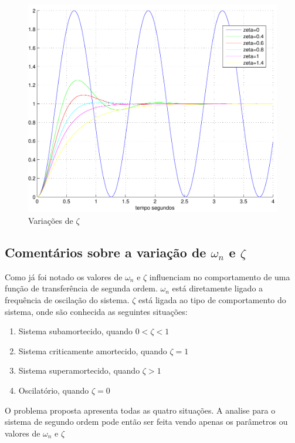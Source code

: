 \documentclass[paper=a4, fontsize=11pt]{article}
\begin{document}
\begin{figure}
    \begin{center}
    \includegraphics[scale=.5]{q1ib.pdf}
    \caption{Variações de $\zeta$}
    \end{center}
\end{figure}

\subsection{Comentários sobre a variação de $\omega_n$ e $\zeta$}

Como já foi notado os valores de $\omega_n$ e $\zeta$ influenciam no comportamento
de uma função de transferência de segunda ordem. $\omega_n$ está diretamente ligado
a frequência de oscilação do sistema. $\zeta$ está ligada ao tipo de comportamento
do sistema, onde são conhecida as seguintes situações: 

\begin{enumerate}
    \item Sistema subamortecido, quando $0<\zeta<1$
    \item Sistema criticamente amortecido, quando $\zeta = 1$
    \item Sistema superamortecido, quando $\zeta > 1$
    \item Oscilatório, quando $\zeta = 0$
\end{enumerate}

O problema proposta apresenta todas as quatro situações. A analise para
o sistema de segundo ordem pode então ser feita vendo apenas os parâmetros
ou valores de $\omega_n$ e $\zeta$
\end{document}
